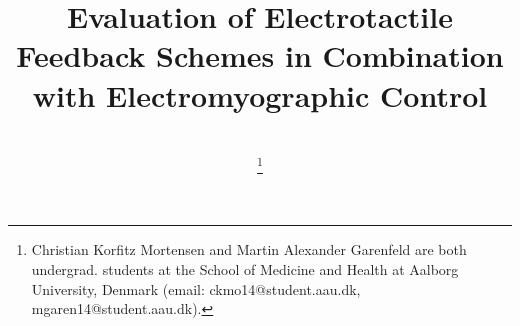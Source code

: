 \documentclass[journal]{IEEEtran}
\begin{document}
\title{Evaluation of Electrotactile Feedback Schemes in Combination with Electromyographic Control\\
}

\author{\\
	\thanks{Christian Korfitz Mortensen and Martin Alexander Garenfeld are both undergrad. students at the School of Medicine and Health at Aalborg University, Denmark (email: ckmo14@student.aau.dk, mgaren14@student.aau.dk). }
} 


%
%
%
%

\maketitle

\begin{abstract}

\end{abstract}
\end{document}
